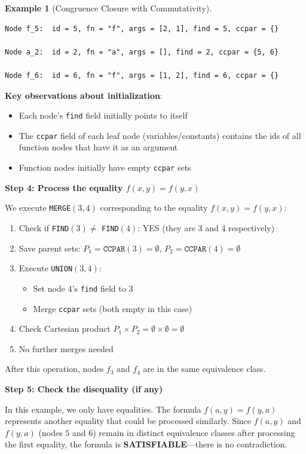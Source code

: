 \documentclass[11pt,a4paper]{article}
\theoremstyle{definition}
\newtheorem{example}{Example}[section]
\theoremstyle{plain}
\theoremstyle{remark}
\begin{document}
\begin{example}[Congruence Closure with Commutativity]
\begin{tcolorbox}[colback=blue!5!white,colframe=blue!75!black,title=\textbf{Initial DAG Node Configuration}]
\begin{verbatim}
Node f_5:  id = 5, fn = "f", args = [2, 1], find = 5, ccpar = {}

Node a_2:  id = 2, fn = "a", args = [], find = 2, ccpar = {5, 6}

Node f_6:  id = 6, fn = "f", args = [1, 2], find = 6, ccpar = {}
\end{verbatim}
\end{tcolorbox}

\textbf{Key observations about initialization}:
\begin{itemize}
    \item Each node's \texttt{find} field initially points to itself
    \item The \texttt{ccpar} field of each leaf node (variables/constants) contains the ids of all function nodes that have it as an argument
    \item Function nodes initially have empty \texttt{ccpar} sets
\end{itemize}

\textbf{Step 4: Process the equality $f(x, y) = f(y, x)$}

We execute \texttt{MERGE}$(3, 4)$ corresponding to the equality $f(x, y) = f(y, x)$:

\begin{enumerate}
    \item Check if \texttt{FIND}$(3) \neq$ \texttt{FIND}$(4)$: YES (they are $3$ and $4$ respectively)
    \item Save parent sets: $P_1 = \texttt{CCPAR}(3) = \emptyset$, $P_2 = \texttt{CCPAR}(4) = \emptyset$
    \item Execute \texttt{UNION}$(3, 4)$:
    \begin{itemize}
        \item Set node $4$'s \texttt{find} field to $3$
        \item Merge \texttt{ccpar} sets (both empty in this case)
    \end{itemize}
    \item Check Cartesian product $P_1 \times P_2 = \emptyset \times \emptyset = \emptyset$
    \item No further merges needed
\end{enumerate}

After this operation, nodes $f_3$ and $f_4$ are in the same equivalence class.

\textbf{Step 5: Check the disequality (if any)}

In this example, we only have equalities. The formula $f(a, y) = f(y, a)$ represents another equality that could be processed similarly. Since $f(a, y)$ and $f(y, a)$ (nodes $5$ and $6$) remain in distinct equivalence classes after processing the first equality, the formula is \textbf{SATISFIABLE}---there is no contradiction.
\end{example}
\end{document}
